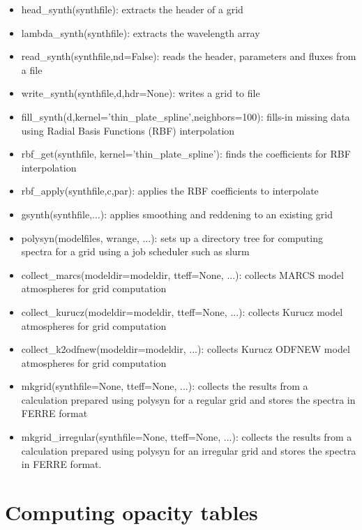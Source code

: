 \documentclass[]{article}
\begin{document}
\begin{itemize}
\item head\_synth(synthfile): extracts the header of a grid
\item lambda\_synth(synthfile): extracts the wavelength array
\item read\_synth(synthfile,nd=False): reads the header, parameters and fluxes from a file
\item write\_synth(synthfile,d,hdr=None): writes a grid to file
\item fill\_synth(d,kernel='thin\_plate\_spline',neighbors=100): fills-in missing data using Radial Basis Functions (RBF) interpolation
\item rbf\_get(synthfile, kernel='thin\_plate\_spline'): finds the coefficients for RBF interpolation
\item rbf\_apply(synthfile,c,par): applies the RBF coefficients to interpolate
\item gsynth(synthfile,...): applies smoothing and reddening to an existing grid
\item polysyn(modelfiles, wrange, ...): sets up a directory tree for computing spectra for a grid using a job scheduler such as slurm
\item collect\_marcs(modeldir=modeldir, tteff=None, ...): collects MARCS model atmospheres for grid computation
\item collect\_kurucz(modeldir=modeldir, tteff=None, ...): collects Kurucz model atmospheres for grid computation
\item collect\_k2odfnew(modeldir=modeldir, ...): collects Kurucz ODFNEW model atmospheres for grid computation
\item mkgrid(synthfile=None, tteff=None, ...): collects the results from a calculation prepared using polysyn for a regular grid and stores the spectra in FERRE format
\item mkgrid\_irregular(synthfile=None, tteff=None, ...): collects the results from a calculation prepared using polysyn for an irregular grid and stores the spectra in FERRE format.
\end{itemize}

\section{Computing opacity tables}
\end{document}
